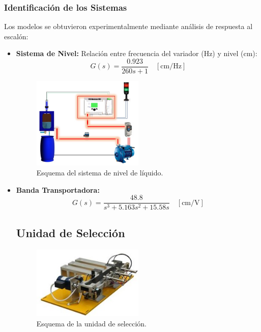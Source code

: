\documentclass[conference]{IEEEtran}
\begin{document}
\subsubsection{Identificación de los Sistemas}
Los modelos se obtuvieron experimentalmente mediante análisis de respuesta al escalón:
\begin{itemize}
    \item \textbf{Sistema de Nivel:}  Relación entre frecuencia del variador (Hz) y nivel (cm):
    \begin{equation}
        G(s) = \frac{0.923}{260s + 1} \quad [\text{cm/Hz}]
    \end{equation}
    
    \begin{figure}[h]
        \centering
        \includegraphics[width=0.5\textwidth]{sistema_nivel}
        \caption{Esquema del sistema de nivel de l\'iquido.}
        \label{fig:sistema_nivel}
    \end{figure}

    \item \textbf{Banda Transportadora:}
    \begin{equation}
        G(s) = \frac{48.8}{s^3 + 5.163s^2 + 15.58s} \quad [\text{cm/V}]
    \end{equation}

    \subsection{Unidad de Selecci\'on}
\begin{figure}[h]
    \centering
    \includegraphics[width=0.5\textwidth]{unid_select}
    \caption{Esquema de la unidad de selecci\'on.}
    \label{fig:unidad_seleccion}
\end{figure}

\end{itemize}
\end{document}
